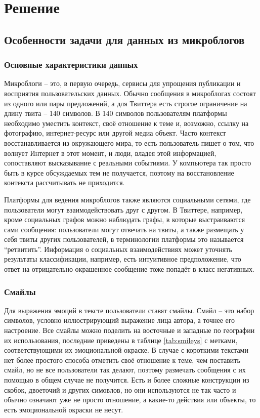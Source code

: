 \section{Решение}

\subsection{Особенности задачи для данных из микроблогов}
\subsubsection{Основные характеристики данных}
Микроблоги -- это, в первую очередь, сервисы для упрощения публикации и восприятия пользовательских
данных. Обычно сообщения в микроблогах состоят из одного или пары предложений, а для Твиттера есть
строгое ограничение на длину твита -- 140 символов. В 140 символов пользователям платформы необходимо
уместить контекст, своё отношение к теме и, возможно, ссылку на фотографию, интернет-ресурс или
другой медиа объект. Часто контекст восстанавливается из окружающего мира, то есть пользователь
пишет о том, что волнует Интернет в этот момент, и люди, владея этой информацией, сопоставляют
высказывание с реальными событиями. У компьютера так просто быть в курсе обсуждаемых тем не
получается, поэтому на восстановление контекста рассчитывать не приходится.

Платформы для ведения микроблогов также являются социальными сетями, где пользователи могут
взаимодействовать друг с другом. В Твиттере, например, кроме социальных графов можно наблюдать
графы, в которые выстраиваются сами сообщения: пользователи могут отвечать на твиты, а также
размещать у себя твиты других пользователей, в терминологии платформы это называется
``ретвитить''. Информация о социальных взаимодействиях может уточнять результаты классификации,
например, есть интуитивное предположение, что ответ на отрицательно окрашенное сообщение тоже
попадёт в класс негативных.

\subsubsection{Смайлы}
Для выражения эмоций в тексте пользователи ставят смайлы. Смайл -- это набор символов, условно
иллюстрирующий выражение лица автора, а точнее его настроение. Все смайлы можно поделить на
восточные и западные по географии их использования, последние приведены в таблице \ref{tab:smileys}
с метками, соответствующими их эмоциональной окраске. В случае с короткими текстами нет более
простого способа отметить своё отношение к теме, чем поставить смайл, но не все пользователи так
делают, поэтому размечать сообщения с их помощью в общем случае не получится. Есть и более сложные
конструкции из скобок, двоеточий и других симовлов, но они используются не так часто и обычно
означают уже не просто отношение, а какие-то действия или объекты, то есть эмоциональной окраски не
несут.

